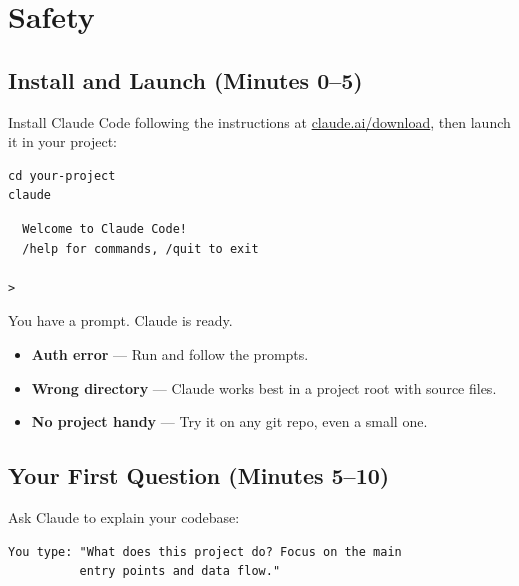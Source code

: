 \documentclass[10pt,oneside]{scrartcl}
\begin{document}
\section{Safety}

\subsection{Install and Launch (Minutes 0--5)}

Install Claude Code following the instructions at
\href{https://claude.ai/download}{claude.ai/download}, then launch it in your project:

\begin{verbatim}
cd your-project
claude
\end{verbatim}


\begin{verbatim}
  Welcome to Claude Code!
  /help for commands, /quit to exit

>
\end{verbatim}

You have a prompt. Claude is ready.

\begin{tipbox}
\begin{itemize}[itemsep=1pt]
  \item \textbf{Auth error} --- Run  and follow the prompts.
  \item \textbf{Wrong directory} --- Claude works best in a project root with source files.
  \item \textbf{No project handy} --- Try it on any git repo, even a small one.
\end{itemize}
\end{tipbox}

\subsection{Your First Question (Minutes 5--10)}

Ask Claude to explain your codebase:

\begin{verbatim}
You type: "What does this project do? Focus on the main
          entry points and data flow."
\end{verbatim}
\end{document}
